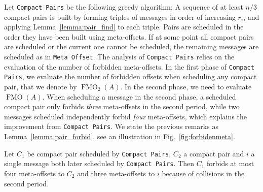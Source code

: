 \documentclass[a4paper,UKenglish,cleveref, autoref, thm-restate]{lipics-v2019}
\DeclareMathOperator{\Fmo}{FMO}
\newcommand\compactpair{\texttt{Compact Pairs}\xspace}
\newcommand\metaoffset{\texttt{Meta Offset}\xspace}
\begin{document}
Let \compactpair be the following greedy algorithm:  A sequence of at least $n/3$ compact pairs is built by forming triples of messages in order of increasing $r_i$, and applying Lemma~\ref{lemma:pair_find} to each triple. Pairs are scheduled in the order they have been built using meta-offsets. If at some point all compact pairs are scheduled or the current one cannot be scheduled, the remaining messages are scheduled as in \metaoffset. The analysis of \compactpair relies on the evaluation of the number of forbidden meta-offsets. In the first phase of \compactpair, we evaluate the number of forbidden offsets when scheduling any compact pair, that we denote by $\Fmo_2(A)$. In the second phase, we need to evaluate $\Fmo(A)$. When scheduling a message in the second phase, a scheduled compact pair only forbids \emph{three} meta-offsets in the second period, while two messages scheduled independently forbid \emph{four} meta-offsets, which explains the improvement from \compactpair. We state the previous remarks as Lemma~\ref{lemma:pair_forbid}, see an illustration in Fig.~\ref{fig:forbidenmeta}. 

\begin{lemma}\label{lemma:pair_forbid}
Let $C_1$ be compact pair scheduled by \compactpair, $C_2$ a compact pair and $i$ a single message both later scheduled by \compactpair.
Then $C_1$ forbids at most four meta-offsets to $C_2$ and three meta-offsets to $i$ because of collisions in the second period. 
\end{lemma}
\end{document}
